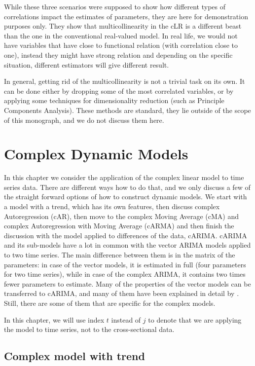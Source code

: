 \documentclass[
]{book}
\begin{document}
While these three scenarios were supposed to show how different types of correlations impact the estimates of parameters, they are here for demonstration purposes only. They show that multicollinearity in the cLR is a different beast than the one in the conventional real-valued model. In real life, we would not have variables that have close to functional relation (with correlation close to one), instead they might have strong relation and depending on the specific situation, different estimators will give different result.

In general, getting rid of the multicollinearity is not a trivial task on its own. It can be done either by dropping some of the most correlated variables, or by applying some techniques for dimensionality reduction (such as Principle Components Analysis). These methods are standard, they lie outside of the scope of this monograph, and we do not discuss them here.

\hypertarget{Dynamic}{%
\chapter{Complex Dynamic Models}\label{Dynamic}}

In this chapter we consider the application of the complex linear model to time series data. There are different ways how to do that, and we only discuss a few of the straight forward options of how to construct dynamic models. We start with a model with a trend, which has its own features, then discuss complex Autoregression (cAR), then move to the complex Moving Average (cMA) and complex Autoregression with Moving Average (cARMA) and then finish the discussion with the model applied to differences of the data, cARIMA. cARIMA and its sub-models have a lot in common with the vector ARIMA models applied to two time series. The main difference between them is in the matrix of the parameters: in case of the vector models, it is estimated in full (four parameters for two time series), while in case of the complex ARIMA, it contains two times fewer parameters to estimate. Many of the properties of the vector models can be transferred to cARIMA, and many of them have been explained in detail by \citet{Lutkepohl}. Still, there are some of them that are specific for the complex models.

In this chapter, we will use index \(t\) instead of \(j\) to denote that we are applying the model to time series, not to the cross-sectional data.

\hypertarget{DynamicTrend}{%
\section{Complex model with trend}\label{DynamicTrend}}
\end{document}
